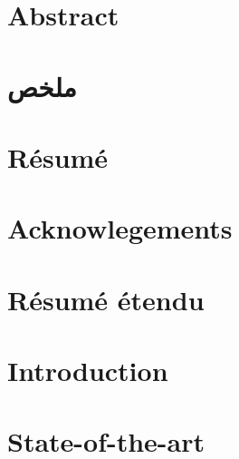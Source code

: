 \documentclass[12pt, twoside]{book}
\begin{document}
    \VerbatimFootnotes
    \dominitoc
    \doparttoc
    \frontmatter
    \pagestyle{plain}
   
    
    
    
    \chapter{Abstract}
        \adjustmtc
        

    \chapter{ملخص}
        \adjustmtc
        

    \chapter{Résumé}
        \adjustmtc
        

    \tableofcontents
    \listoffigures
    \listoftables

    \chapter{Acknowlegements}
        \adjustmtc
        

    \mainmatter

    \chapter*{Résumé étendu}
        

    \chapter{Introduction}
        \label{chap::introduction}
        
    
    \chapter{State-of-the-art}
        \label{chap::state_of_the_art}
        
\end{document}
